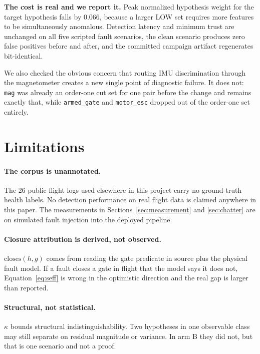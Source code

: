 \documentclass[11pt,a4paper]{article}
\newcommand{\code}[1]{\texttt{\small #1}}
\begin{document}
\textbf{The cost is real and we report it.} Peak normalized hypothesis weight for the
target hypothesis falls by 0.066, because a larger LOW set requires more features to
be simultaneously anomalous. Detection latency and minimum trust are unchanged
on all five scripted fault scenarios, the clean scenario produces zero false
positives before and after, and the committed campaign artifact regenerates
bit-identical.

We also checked the obvious concern that routing IMU discrimination through
the magnetometer creates a new single point of diagnostic failure. It does
not: \code{mag} was already an order-one cut set for one pair before the change
and remains exactly that, while \code{armed\_gate} and \code{motor\_esc}
dropped out of the order-one set entirely.

\section{Limitations}
\label{sec:limits}

\paragraph{The corpus is unannotated.} The 26 public flight logs used
elsewhere in this project carry no ground-truth health labels. No detection
performance on real flight data is claimed anywhere in this paper. The
measurements in Sections~\ref{sec:measurement} and \ref{sec:chatter} are on
simulated fault injection into the deployed pipeline.

\paragraph{Closure attribution is derived, not observed.}
$\mathrm{closes}(h,g)$ comes from reading the gate predicate in source plus the
physical fault model. If a fault closes a gate in flight that the model says it
does not, Equation~\ref{eq:seff} is wrong in the optimistic direction and the
real gap is larger than reported.

\paragraph{Structural, not statistical.} $\kappa$ bounds structural
indistinguishability. Two hypotheses in one observable class may still separate
on residual magnitude or variance. In arm B they did not, but that is one
scenario and not a proof.
\end{document}
